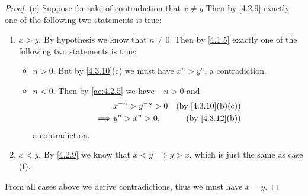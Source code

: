 \begin{proof}{(c)}
  Suppose for sake of contradiction that \(x \neq y\)
  Then by \cref{4.2.9} exactly one of the following two statements is true:
  \begin{enumerate}[label=(\Roman*)]
    \item \(x > y\).
          By hypothesis we know that \(n \neq 0\).
          Then by \cref{4.1.5} exactly one of the following two statements is true:
          \begin{itemize}
            \item \(n > 0\).
                  But by \cref{4.3.10}(c) we must have \(x^n > y^n\), a contradiction.
            \item \(n < 0\).
                  Then by \cref{ac:4.2.5} we have \(-n > 0\) and
                  \begin{align*}
                             & x^{-n} > y^{-n} > 0 & \text{(by \cref{4.3.10}(b)(c))} \\
                    \implies & y^n > x^n > 0,      & \text{(by \cref{4.3.12}(b))}
                  \end{align*}
                  a contradiction.
          \end{itemize}
    \item \(x < y\).
          By \cref{4.2.9} we know that \(x < y \implies y > x\), which is just the same as case (I).
  \end{enumerate}
  From all cases above we derive contradictions, thus we must have \(x = y\).
\end{proof}

